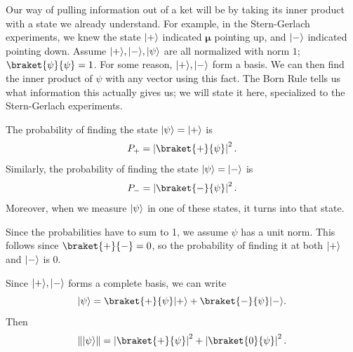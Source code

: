  Our way of pulling information out of a ket will be by taking its inner product with a state we already understand. For example, in the Stern-Gerlach experiments, we knew the state $ \lvert+\rangle $ indicated $\boldsymbol{\mu} $ pointing up, and $ \lvert-\rangle $ indicated pointing down. Assume $ \lvert+\rangle , \lvert-\rangle , \lvert\psi\rangle $ are all normalized with norm $1$; $\braket{\psi }{\psi } =1$. For some reason, $ \lvert+\rangle , \lvert-\rangle $ form a basis. We can then find the inner product of $\psi $ with any vector using this fact. The Born Rule tells us what information this actually gives us; we will state it here, specialized to the Stern-Gerlach experiments.

 \begin{proposition}\label{prp:1.1}
 	The probability of finding the state $ \lvert\psi\rangle = \lvert+\rangle $ is
	\[
		P_+ = \left| \braket{+}{\psi }  \right| ^2
	.\]
	Similarly, the probability of finding the state $ \lvert\psi\rangle =\lvert-\rangle $ is
	\[
		P_-=\left| \braket{-}{\psi }  \right| ^2
	.\]
	Moreover, when we measure $ \lvert\psi\rangle $ in one of these states, it turns into that state.
 \end{proposition}

Since the probabilities have to sum to 1, we assume $\psi $ has a unit norm. This follows since $\braket{+}{-} =0$, so the probability of finding it at both $ \lvert+\rangle $ and $ \lvert-\rangle $ is 0.

Since $ \lvert+\rangle ,\lvert-\rangle $ forms a complete basis, we can write
\[
	\ket{\psi} = \braket{+}{\psi }\ket{+}  + \braket{-}{\psi } \ket{-} 
.\]
Then
\[
	\left\lVert \ket{\psi}  \right\rVert = \left| \braket{+}{\psi }  \right| ^2 + \left| \braket{0}{\psi }  \right| ^2
.\]

